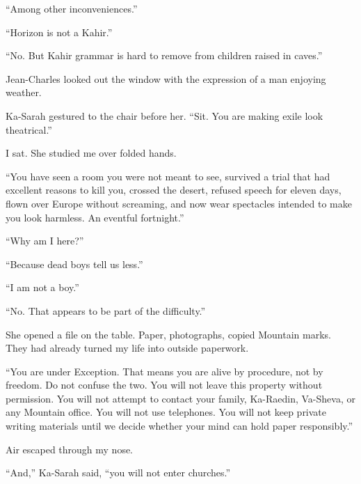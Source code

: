 ``Among other inconveniences.''\par

``Horizon is not a Kahir.''\par

``No. But Kahir grammar is hard to remove from children raised in caves.''\par

Jean-Charles looked out the window with the expression of a man enjoying weather.\par

Ka-Sarah gestured to the chair before her. ``Sit. You are making exile look theatrical.''\par

I sat. She studied me over folded hands.\par

``You have seen a room you were not meant to see, survived a trial that had excellent reasons to kill you, crossed the desert, refused speech for eleven days, flown over Europe without screaming, and now wear spectacles intended to make you look harmless. An eventful fortnight.''\par

``Why am I here?''\par

``Because dead boys tell us less.''\par

``I am not a boy.''\par

``No. That appears to be part of the difficulty.''\par

She opened a file on the table. Paper, photographs, copied Mountain marks. They had already turned my life into outside paperwork.\par

``You are under Exception. That means you are alive by procedure, not by freedom. Do not confuse the two. You will not leave this property without permission. You will not attempt to contact your family, Ka-Raedin, Va-Sheva, or any Mountain office. You will not use telephones. You will not keep private writing materials until we decide whether your mind can hold paper responsibly.''\par

Air escaped through my nose.\par

``And,'' Ka-Sarah said, ``you will not enter churches.''\par

